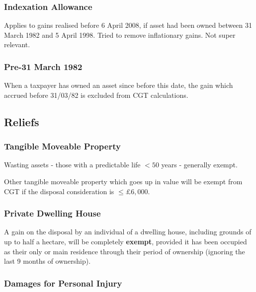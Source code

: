 \documentclass[
]{article}
\begin{document}
\hypertarget{indexation-allowance}{%
\subsubsection{Indexation Allowance}\label{indexation-allowance}}

Applies to gains realised before 6 April 2008, if asset had been owned
between 31 March 1982 and 5 April 1998. Tried to remove inflationary
gains. Not super relevant.

\hypertarget{pre-31-march-1982}{%
\subsubsection{Pre-31 March 1982}\label{pre-31-march-1982}}

When a taxpayer has owned an asset since before this date, the gain
which accrued before 31/03/82 is excluded from CGT calculations.

\hypertarget{reliefs}{%
\subsection{Reliefs}\label{reliefs}}

\hypertarget{tangible-moveable-property}{%
\subsubsection{Tangible Moveable
Property}\label{tangible-moveable-property}}

Wasting assets - those with a predictable life \(<50\) years - generally
exempt.

Other tangible moveable property which goes up in value will be exempt
from CGT if the disposal consideration is \(\leq £6,000\).

\hypertarget{private-dwelling-house}{%
\subsubsection{Private Dwelling House}\label{private-dwelling-house}}

A gain on the disposal by an individual of a dwelling house, including
grounds of up to half a hectare, will be completely \textbf{exempt},
provided it has been occupied as their only or main residence through
their period of ownership (ignoring the last 9 months of ownership).

\hypertarget{damages-for-personal-injury}{%
\subsubsection{Damages for Personal
Injury}\label{damages-for-personal-injury}}
\end{document}
